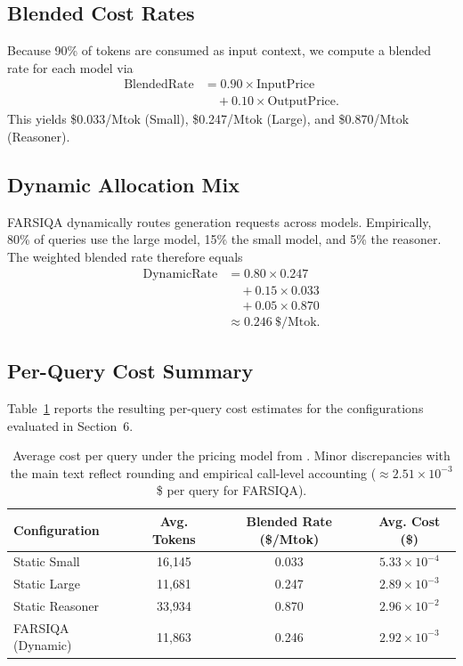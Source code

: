 \documentclass[11pt]{article}
\begin{document}
\subsection{Blended Cost Rates}

Because 90\% of tokens are consumed as input context, we compute a blended rate for each model via
\begin{align}
    \text{BlendedRate} &= 0.90 \times \text{InputPrice} \nonumber \\
                       &\quad+ 0.10 \times \text{OutputPrice}.
\end{align}
This yields \$0.033/Mtok (Small), \$0.247/Mtok (Large), and \$0.870/Mtok (Reasoner).

\subsection{Dynamic Allocation Mix}

FARSIQA dynamically routes generation requests across models. Empirically, 80\% of queries use the large model, 15\% the small model, and 5\% the reasoner. The weighted blended rate therefore equals
\begin{align}
  	\text{DynamicRate} &= 0.80 \times 0.247 \nonumber \\
                     &\quad+ 0.15 \times 0.033 \nonumber \\
                     &\quad+ 0.05 \times 0.870 \label{eq:dynamic-rate} \\
                     &\approx 0.246~\$/\text{Mtok}. \nonumber
\end{align}

\subsection{Per-Query Cost Summary}

Table~\ref{tab:cost-summary} reports the resulting per-query cost estimates for the configurations evaluated in Section~6.

\begin{table}[t]
\centering
\small
\begin{tabular}{lccc}
\hline
\textbf{Configuration} & \textbf{Avg. Tokens} & \textbf{Blended Rate (\$/Mtok)} & \textbf{Avg. Cost (\$)} \\
\hline
Static Small & 16{,}145 & 0.033 & $5.33\times10^{-4}$ \\
Static Large & 11{,}681 & 0.247 & $2.89\times10^{-3}$ \\
Static Reasoner & 33{,}934 & 0.870 & $2.96\times10^{-2}$ \\
FARSIQA (Dynamic) & 11{,}863 & 0.246 & $2.92\times10^{-3}$ \\
\hline
\end{tabular}
\caption{Average cost per query under the pricing model from \cite{DeepInfraPricing2025}. Minor discrepancies with the main text reflect rounding and empirical call-level accounting ($\approx 2.51\times10^{-3}$ \$ per query for FARSIQA).}
\label{tab:cost-summary}
\end{table}
\end{document}
